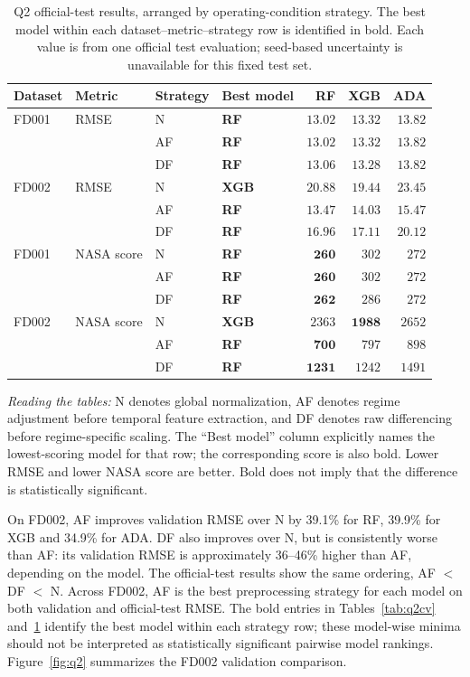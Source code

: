 \documentclass[10pt,a4paper]{article}
\begin{document}
\begin{table}[H]\centering\small
\caption{Q2 official-test results, arranged by operating-condition strategy. The best model within each dataset--metric--strategy row is identified in bold. Each value is from one official test evaluation; seed-based uncertainty is unavailable for this fixed test set.}\label{tab:q2test}
\begin{tabular}{lll lrrr}\toprule
Dataset & Metric & Strategy & Best model & RF & XGB & ADA\\\midrule
FD001 & RMSE & N & \textbf{RF} & $\mathbf{13.02}$ & $13.32$ & $13.82$\\
 & & AF & \textbf{RF} & $\mathbf{13.02}$ & $13.32$ & $13.82$\\
 & & DF & \textbf{RF} & $\mathbf{13.06}$ & $13.28$ & $13.82$\\
FD002 & RMSE & N & \textbf{XGB} & $20.88$ & $\mathbf{19.44}$ & $23.45$\\
 & & AF & \textbf{RF} & $\mathbf{13.47}$ & $14.03$ & $15.47$\\
 & & DF & \textbf{RF} & $\mathbf{16.96}$ & $17.11$ & $20.12$\\\midrule
FD001 & NASA score & N & \textbf{RF} & $\mathbf{260}$ & $302$ & $272$\\
 & & AF & \textbf{RF} & $\mathbf{260}$ & $302$ & $272$\\
 & & DF & \textbf{RF} & $\mathbf{262}$ & $286$ & $272$\\
FD002 & NASA score & N & \textbf{XGB} & $2363$ & $\mathbf{1988}$ & $2652$\\
 & & AF & \textbf{RF} & $\mathbf{700}$ & $797$ & $898$\\
 & & DF & \textbf{RF} & $\mathbf{1231}$ & $1242$ & $1491$\\\bottomrule
\end{tabular}
\end{table}

\noindent\textit{Reading the tables:} N denotes global normalization, AF denotes regime adjustment before temporal feature extraction, and DF denotes raw differencing before regime-specific scaling. The ``Best model'' column explicitly names the lowest-scoring model for that row; the corresponding score is also bold. Lower RMSE and lower NASA score are better. Bold does not imply that the difference is statistically significant.

On FD002, AF improves validation RMSE over N by 39.1\% for RF, 39.9\% for XGB and 34.9\% for ADA. DF also improves over N, but is consistently worse than AF: its validation RMSE is approximately 36--46\% higher than AF, depending on the model. The official-test results show the same ordering, AF $<$ DF $<$ N. Across FD002, AF is the best preprocessing strategy for each model on both validation and official-test RMSE. The bold entries in Tables~\ref{tab:q2cv} and~\ref{tab:q2test} identify the best model within each strategy row; these model-wise minima should not be interpreted as statistically significant pairwise model rankings. Figure~\ref{fig:q2} summarizes the FD002 validation comparison.
\end{document}
